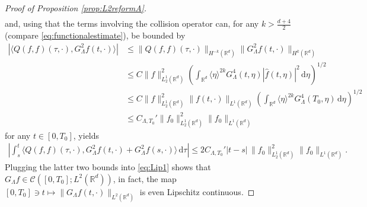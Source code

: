\documentclass[11pt,a4paper,reqno]{amsart}
\theoremstyle{plain}
\theoremstyle{definition}
\begin{document}
\begin{proof}[Proof of Proposition \ref{prop:L2reformA}]
\begin{align*}
\end{align*}
and, using that the terms involving the collision operator can, for any $k>\frac{d+4}{2}$ (compare \eqref{eq:functionalestimate}), be bounded by
\begin{align*}
	|\langle Q(f,f)(\tau, \cdot), G_{\Lambda}^2f(t,\cdot)\rangle| &\leq \|Q(f,f)(\tau, \cdot)\|_{H^{-k}({\mathbb{R}}^d)} \| G_{\Lambda}^2 f(t, \cdot)\|_{H^k({\mathbb{R}}^d)} \\
	&\leq C \|f\|_{L^1_2({\mathbb{R}}^d)}^2 \left( \int_{{\mathbb{R}}^d} \langle\eta\rangle^{2k} G_{\Lambda}^4(t,\eta) |\hat{f}(t,\eta)|^2 \, \mathrm{d}\eta \right)^{1/2} \\
	&\leq C \|f\|_{L^1_2({\mathbb{R}}^d)}^2 \|f(t,\cdot)\|_{L^1({\mathbb{R}}^d)} \left(\int_{{\mathbb{R}}^d} \langle\eta\rangle^{2k}G_{\Lambda}^4(T_0,\eta)\,\mathrm{d}\eta\right)^{1/2} \\
	&\leq C_{\Lambda,T_0}' \|f_0\|_{L^1_2({\mathbb{R}}^d)}^2 \|f_0\|_{L^1({\mathbb{R}}^d)}
\end{align*}
for any $t\in[0,T_0]$, yields
\begin{align*}
	\left| \int_{s}^t \langle Q(f,f)(\tau, \cdot), G_{\Lambda}^2f(t,\cdot) + G_{\Lambda}^2f(s,\cdot) \rangle \,\mathrm{d}\tau \right| \leq 2 C_{\Lambda, T_0}' |t-s| \, \|f_0\|_{L^1_2({\mathbb{R}}^d)}^2 \|f_0\|_{L^1({\mathbb{R}}^d)}.
\end{align*}
Plugging the latter two bounds into  \eqref{eq:Lip1} shows that $G_{\Lambda}f\in \mathcal{C}([0,T_0]; L^2({\mathbb{R}}^d))$,
in fact, the map $[0,T_0]\ni t\mapsto \|G_\Lambda f(t,\cdot)\|_{L^2({\mathbb{R}}^d)}$ is even Lipschitz continuous.
\bigskip


\end{proof}
\end{document}
